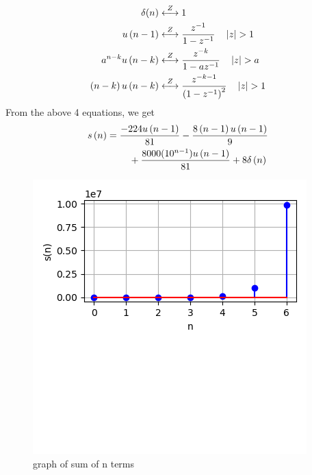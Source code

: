 \documentclass[journal,12pt,twocolumn]{IEEEtran}
\begin{document}
 \begin{align}
\label{eq:eq11}
\delta (n) &\overset{Z}\longleftrightarrow 1\\
\label{eq:eq12}
u \left(n-1\right)&\overset{Z}\longleftrightarrow\frac{z^{-1}}{1-z^{-1}} \quad \left\vert z\right\vert > 1 \\
\label{eq:eq13}
a^{n-k}u\left(n-k\right)&\overset{Z}\longleftrightarrow\frac{z^{-k}}{1-az^{-1}} \quad \left\vert z\right\vert > a \\
\label{eq:eq14}
\left(n-k\right)u\left(n-k\right)&\overset{Z}\longleftrightarrow\frac{z^{-k-1}}{\left(1-z^{-1}\right)^2} \quad \left\vert z\right\vert > 1 
\end{align}
From the above 4 equations, we get
 \begin{align}
 \notag s\left(n\right)&=\frac{-224u\left(n-1\right)}{81}-\frac{8\left(n-1\right)u\left(n-1\right)}{9}\\&~~~~~~~
 +\frac{8000(10^{n-1})u\left(n-1\right)}{81}+8\delta \left(n\right)
\end{align}
\begin{figure}[h!]
    \centering
    \includegraphics[width=\columnwidth]{figs/plot.png}
    \caption{graph of sum of n terms}
    \label{fig:1}
\end{figure}
 
\end{document}
